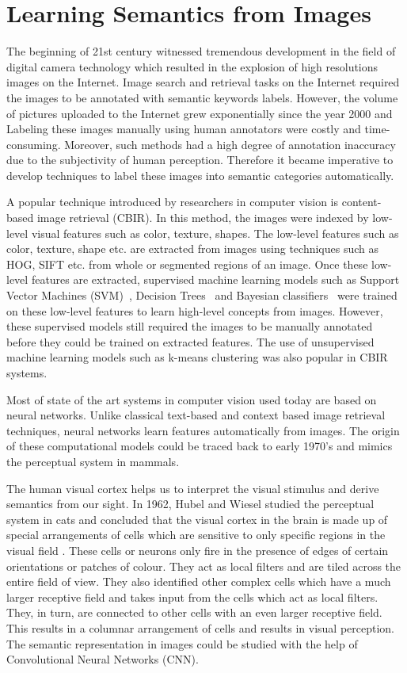\section{Learning Semantics from Images}

The beginning of 21st century witnessed tremendous development in the field of digital camera technology which resulted in the explosion of high resolutions images on the Internet. Image search and retrieval tasks on the Internet required the images to be annotated with semantic keywords labels. However, the volume of pictures uploaded to the Internet grew exponentially since the year 2000 and Labeling these images manually using human annotators were costly and time-consuming. Moreover, such methods had a high degree of annotation inaccuracy due to the subjectivity
of human perception. Therefore it became imperative to develop techniques to label these images into semantic categories automatically.

A popular technique introduced by researchers in computer vision is content-based image retrieval
(CBIR). In this method, the images were indexed by low-level visual features such as color,
texture, shapes. The low-level features such as color, texture, shape etc. are extracted from images using techniques such as HOG, SIFT etc. from whole or segmented regions of an image. Once these low-level features are extracted, supervised machine learning models such as Support Vector Machines (SVM)~\cite{feng2003bootstrapping}, Decision Trees~\cite{shyu2000relevance} and Bayesian classifiers~\cite{jin2004semi} were trained on these low-level features to learn high-level concepts from images. However, these supervised models still required the images to be manually annotated before they could be trained on extracted features. The use of unsupervised machine learning models such as k-means clustering was also popular in CBIR systems. 

Most of state of the art systems in computer vision used today are based on neural networks. Unlike classical text-based and context based image retrieval techniques, neural networks learn features automatically from images. The origin of these computational models could be traced back to early 1970's and mimics the perceptual system in mammals.

The human visual cortex helps us to interpret the visual stimulus and derive semantics from our sight. In 1962, Hubel and Wiesel studied the perceptual system in cats and concluded that the visual cortex in the brain is made up of special arrangements of cells which are sensitive to only specific regions in the visual field \cite{Hubel992}. These cells or neurons only fire in the presence of edges of certain orientations or patches of colour. They act as local filters and are tiled across the entire field of view. They also identified other complex cells which have a much larger receptive field and takes input from the cells which act as local filters. They, in turn, are connected to other cells with an even larger receptive field. This results in a columnar arrangement of cells and results in visual perception. The semantic representation in images could be studied with the help of Convolutional Neural Networks (CNN).


